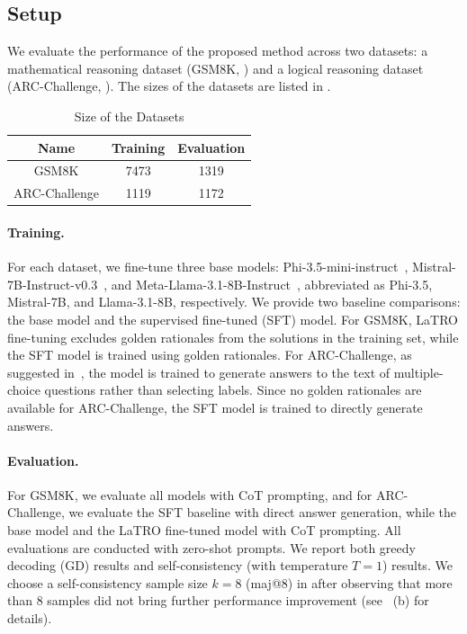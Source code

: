 \subsection{Setup}
We evaluate the performance of the proposed method across two datasets: a mathematical reasoning dataset (GSM8K, \citet{cobbe2021training}) and a logical reasoning dataset (ARC-Challenge, \citet{DBLP:conf/naacl/TalmorHLB19}). The sizes of the datasets are listed in .

\begin{table}
    \caption{Size of the Datasets}
    \vspace{-1em}
    \label{tab:datasets}
    \begin{center}        
    \def\arraystretch{1}
    \begin{tabular}{c|cc}
        \toprule
        \bf Name & \bf Training & \bf Evaluation \\
        \hline
        GSM8K & 7473 & 1319 \\
        ARC-Challenge & 1119 & 1172 \\
        \bottomrule
    \end{tabular}
    \vspace{-1em}
    \end{center}
\end{table}

\paragraph{Training.}
For each dataset, we fine-tune three base models: Phi-3.5-mini-instruct~\citep{DBLP:journals/corr/abs-2404-14219}, Mistral-7B-Instruct-v0.3~\citep{DBLP:journals/corr/abs-2310-06825}, and Meta-Llama-3.1-8B-Instruct~\citep{DBLP:journals/corr/abs-2407-21783}, abbreviated as Phi-3.5, Mistral-7B, and Llama-3.1-8B, respectively. We provide two baseline comparisons: the base model and the supervised fine-tuned (SFT) model. For GSM8K, LaTRO fine-tuning excludes golden rationales from the solutions in the training set, while the SFT model is trained using golden rationales. For ARC-Challenge, as suggested in~\citep{zheng2024large}, the model is trained to generate answers to the text of multiple-choice questions rather than selecting labels. Since no golden rationales are available for ARC-Challenge, the SFT model is trained to directly generate answers.

\paragraph{Evaluation.}
For GSM8K, we evaluate all models with CoT prompting, and for ARC-Challenge, we evaluate the SFT baseline with direct answer generation, while the base model and the LaTRO fine-tuned model with CoT prompting. All evaluations are conducted with zero-shot prompts. We report both greedy decoding (GD) results and self-consistency (with temperature $T=1$) results. We choose a self-consistency sample size $k=8$ (maj@8) in  after observing that more than 8 samples did not bring further performance improvement (see ~(b) for details).

